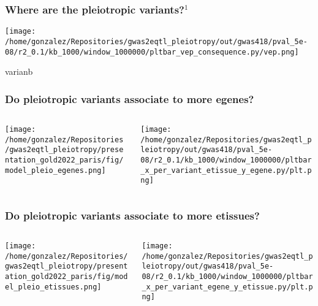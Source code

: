 \documentclass{beamer}
\begin{document}
\begin{frame}
\frametitle{Where are the pleiotropic variants?$^1$}

    \begin{center}
\texttt{[image: /home/gonzalez/Repositories/gwas2eqtl\_pleiotropy/out/gwas418/pval\_5e-08/r2\_0.1/kb\_1000/window\_1000000/pltbar\_vep\_consequence.py/vep.png]}
     \end{center}
varianb
\let\thefootnote\relax{}
     
\end{frame}

\begin{frame}
\frametitle{Do pleiotropic variants associate to more egenes?}

\begin{columns}
\begin{column}{0.5\textwidth}
    \begin{center}
\texttt{[image: /home/gonzalez/Repositories/gwas2eqtl\_pleiotropy/presentation\_gold2022\_paris/fig/model\_pleio\_egenes.png]}
     \end{center}
\end{column}
\begin{column}{0.5\textwidth}  %
    \begin{center}
\texttt{[image: /home/gonzalez/Repositories/gwas2eqtl\_pleiotropy/out/gwas418/pval\_5e-08/r2\_0.1/kb\_1000/window\_1000000/pltbar\_x\_per\_variant\_etissue\_y\_egene.py/plt.png]}
     \end{center}
\end{column}
\end{columns}

\end{frame}

\begin{frame}
\frametitle{Do pleiotropic variants associate to more etissues?}

\begin{columns}
\begin{column}{0.5\textwidth}
    \begin{center}
\texttt{[image: /home/gonzalez/Repositories/gwas2eqtl\_pleiotropy/presentation\_gold2022\_paris/fig/model\_pleio\_etissues.png]}
     \end{center}
\end{column}
\begin{column}{0.5\textwidth}  %
    \begin{center}
\texttt{[image: /home/gonzalez/Repositories/gwas2eqtl\_pleiotropy/out/gwas418/pval\_5e-08/r2\_0.1/kb\_1000/window\_1000000/pltbar\_x\_per\_variant\_egene\_y\_etissue.py/plt.png]}
     \end{center}
\end{column}
\end{columns}

\end{frame}
\end{document}
